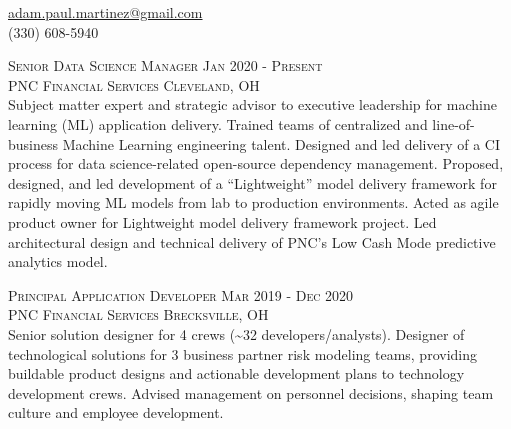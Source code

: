 \documentclass[letterpaper, 11pt]{article} %
\begin{document}
\pagestyle{empty} %



\vspace{-0.5em}

\begin{center}
\href{mailto:adam.paul.martinez@gmail.com}{adam.paul.martinez@gmail.com} \\
(330) 608-5940
\end{center}

\vspace{0.5em}

\justify

\textsc{Senior Data Science Manager \hfill Jan 2020 - Present} \\
\textsc{PNC Financial Services \hfill Cleveland, OH} \\
Subject matter expert and strategic advisor to executive leadership for machine learning (ML) application delivery.
Trained teams of centralized and line-of-business Machine Learning engineering talent.
Designed and led delivery of a CI process for data science-related open-source dependency management.
Proposed, designed, and led development of a ``Lightweight'' model delivery framework for rapidly moving ML models from lab to production environments.
Acted as agile product owner for Lightweight model delivery framework project.
Led architectural design and technical delivery of PNC's Low Cash Mode predictive analytics model.

\textsc{Principal Application Developer \hfill Mar 2019 - Dec 2020} \\
\textsc{PNC Financial Services \hfill Brecksville, OH} \\
Senior solution designer for 4 crews (\textasciitilde 32 developers/analysts).
Designer of technological solutions for 3 business partner risk modeling teams, providing buildable product designs and actionable development plans to technology development crews.
Advised management on personnel decisions, shaping team culture and employee development.
\end{document}
